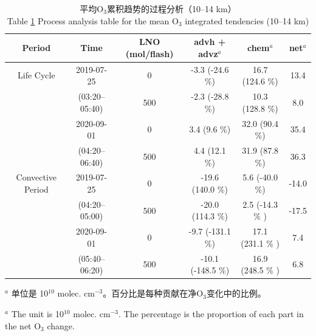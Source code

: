 \begin{table}[h]
\centering
\caption{平均O$_3$累积趋势的过程分析（10--14 km）\\ Table \ref{table:ipr} Process analysis table for the mean O$_3$ integrated tendencies (10--14 km)}
\footnotesize
{\centering
\renewcommand{\arraystretch}{1}
\begin{tabular}{@{\extracolsep{\fill}} cccccc}
\hline
  Period           & Time             & LNO (mol/flash) & advh + advz$^a$       & chem$^a$              & net$^a$    \\
\hline
Life Cycle         & 2019-07-25       & 0               & -3.3 (-24.6 \%)        & 16.7 (124.6 \%)        & 13.4       \\
                   & (03:20--05:40)   & 500             & -2.3 (-28.8 \%)        & 10.3 (128.8 \%)        & 8.0        \\
\cline{2-6}
                   & 2020-09-01       & 0               & 3.4  (9.6 \%)          & 32.0 (90.4 \%)         & 35.4       \\
                   & (04:20--06:40)   & 500             & 4.4  (12.1 \%)         & 31.9 (87.8 \%)         & 36.3       \\
\hline
Convective Period   & 2019-07-25      & 0              & -19.6 (140.0 \%)       & 5.6 (-40.0 \%)         & -14.0      \\
                    & (04:20--05:00)  & 500            & -20.0 (114.3 \%)       & 2.5 (-14.3 \% )        & -17.5      \\
\cline{2-6}
                    & 2020-09-01      & 0              & -9.7  (-131.1 \%)      & 17.1 (231.1 \% )       & 7.4        \\
                    & (05:40--06:20)  & 500            & -10.1 (-148.5 \%)      & 16.9 (248.5 \% )       & 6.8        \\
\hline
\end{tabular}
\par }
\begin{tablenotes}
\linespread{1}\footnotesize
\item $^{a}$ 单位是 10$^{10}$ molec. cm$^{-3}$。百分比是每种贡献在净O$_3$变化中的比例。 \\
\item $^{a}$ The unit is 10$^{10}$ molec. cm$^{-3}$. The percentage is the proportion of each part in the net O$_3$ change.
\end{tablenotes}
\label{table:ipr}
\end{table}


